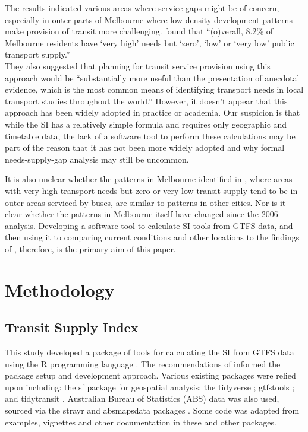 \documentclass[preprint, 3p,
authoryear]{elsarticle} %
\begin{document}
The results indicated various areas where service gaps might be of
concern, especially in outer parts of Melbourne where low density
development patterns make provision of transit more challenging.
\citet{currie2010identifying} found that ``(o)verall, 8.2\% of Melbourne
residents have `very high' needs but `zero', `low' or `very low' public
transport supply.''\\
They also suggested that planning for transit service provision using
this approach would be ``substantially more useful than the presentation
of anecdotal evidence, which is the most common means of identifying
transport needs in local transport studies throughout the world.''
However, it doesn't appear that this approach has been widely adopted in
practice or academia. Our suspicion is that while the SI has a
relatively simple formula and requires only geographic and timetable
data, the lack of a software tool to perform these calculations may be
part of the reason that it has not been more widely adopted and why
formal needs-supply-gap analysis may still be uncommon.

It is also unclear whether the patterns in Melbourne identified in
\citet{currie2010identifying}, where areas with very high transport
needs but zero or very low transit supply tend to be in outer areas
serviced by buses, are similar to patterns in other cities. Nor is it
clear whether the patterns in Melbourne itself have changed since the
2006 analysis. Developing a software tool to calculate SI tools from
GTFS data, and then using it to comparing current conditions and other
locations to the findings of \citet{currie2010identifying}, therefore,
is the primary aim of this paper.

\section{Methodology}\label{methodology}

\subsection{Transit Supply Index}\label{transit-supply-index}

This study developed a package of tools for calculating the SI from GTFS
data using the R programming language \citep{R-base}. The
recommendations of \citet{wickham2023r} informed the package setup and
development approach. Various existing packages were relied upon
including: the sf package \citep{R-sf} for geospatial analysis; the
tidyverse \citep{tidyverse2019}; gtfstools \citep{R-gtfstools}; and
tidytransit \citep{R-tidytransit}. Australian Bureau of Statistics (ABS)
data was also used, sourced via the strayr and absmapsdata packages
\citep{r-strayr}. Some code was adapted from examples, vignettes and
other documentation in these and other packages.
\end{document}

